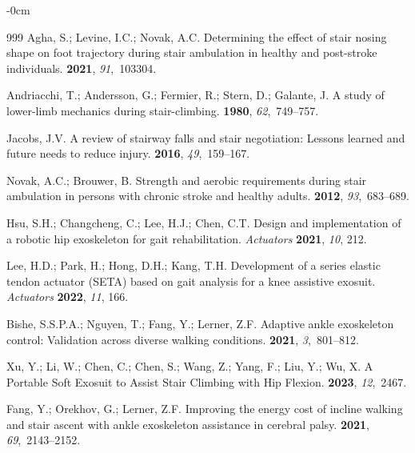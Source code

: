 \documentclass[actuators,article,accept,pdftex,moreauthors]{Definitions/mdpi}
\begin{document}
\begin{adjustwidth}{-\extralength}{0cm}
\begin{thebibliography}{999}
Agha, S.; Levine, I.C.; Novak, A.C.
\newblock Determining the effect of stair nosing shape on foot trajectory
  during stair ambulation in healthy and post-stroke individuals.
 {\bf 2021}, {\em 91},~103304.

Andriacchi, T.; Andersson, G.; Fermier, R.; Stern, D.; Galante, J.
\newblock A study of lower-limb mechanics during stair-climbing.
 {\bf 1980}, {\em 62},~749--757.

Jacobs, J.V.
\newblock A review of stairway falls and stair negotiation: Lessons learned and
  future needs to reduce injury.
 {\bf 2016}, {\em 49},~159--167.

Novak, A.C.; Brouwer, B.
\newblock Strength and aerobic requirements during stair ambulation in persons
  with chronic stroke and healthy adults.
 {\bf 2012},
  {\em 93},~683--689.

Hsu, S.H.; Changcheng, C.; Lee, H.J.; Chen, C.T.
\newblock Design and implementation of a robotic hip exoskeleton for gait
  rehabilitation.
\newblock \emph{Actuators}  \textbf{2021}, \emph{10},  212.

Lee, H.D.; Park, H.; Hong, D.H.; Kang, T.H.
\newblock Development of a series elastic tendon actuator (SETA) based on gait
  analysis for a knee assistive exosuit.
\newblock  \emph{Actuators} \textbf{2022}, \emph{11},  166.

Bishe, S.S.P.A.; Nguyen, T.; Fang, Y.; Lerner, Z.F.
\newblock Adaptive ankle exoskeleton control: Validation across diverse walking
  conditions.
 {\bf 2021},
  {\em 3},~801--812.

Xu, Y.; Li, W.; Chen, C.; Chen, S.; Wang, Z.; Yang, F.; Liu, Y.; Wu, X.
\newblock A Portable Soft Exosuit to Assist Stair Climbing with Hip Flexion.
 {\bf 2023}, {\em 12},~2467.

Fang, Y.; Orekhov, G.; Lerner, Z.F.
\newblock Improving the energy cost of incline walking and stair ascent with
  ankle exoskeleton assistance in cerebral palsy.
 {\bf 2021}, {\em
  69},~2143--2152.


\end{thebibliography}
\end{adjustwidth}
\end{document}
